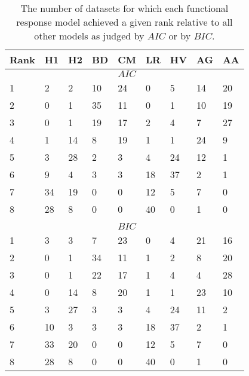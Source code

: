 \begin{table}[!tbp]
\caption{The number of datasets for which each functional response model achieved a given rank relative to all other models as judged by $AIC$ or by $BIC$.\label{table:AIC_and_BIC_rankings}} 
\begin{center}
\begin{tabular}{lllllllll}
\hline\hline
\multicolumn{1}{l}{Rank}&\multicolumn{1}{c}{H1}&\multicolumn{1}{c}{H2}&\multicolumn{1}{c}{BD}&\multicolumn{1}{c}{CM}&\multicolumn{1}{c}{LR}&\multicolumn{1}{c}{HV}&\multicolumn{1}{c}{AG}&\multicolumn{1}{c}{AA}\tabularnewline
\hline
&&&&$AIC$&&&&\tabularnewline
1&2&2&10&24&0&5&14&20\tabularnewline
2&0&1&35&11&0&1&10&19\tabularnewline
3&0&1&19&17&2&4&7&27\tabularnewline
4&1&14&8&19&1&1&24&9\tabularnewline
5&3&28&2&3&4&24&12&1\tabularnewline
6&9&4&3&3&18&37&2&1\tabularnewline
7&34&19&0&0&12&5&7&0\tabularnewline
8&28&8&0&0&40&0&1&0\tabularnewline
&&&&&&&&\tabularnewline
&&&&$BIC$&&&&\tabularnewline
1&3&3&7&23&0&4&21&16\tabularnewline
2&0&1&34&11&1&2&8&20\tabularnewline
3&0&1&22&17&1&4&4&28\tabularnewline
4&0&14&8&20&1&1&23&10\tabularnewline
5&3&27&3&3&4&24&11&2\tabularnewline
6&10&3&3&3&18&37&2&1\tabularnewline
7&33&20&0&0&12&5&7&0\tabularnewline
8&28&8&0&0&40&0&1&0\tabularnewline
\hline
\end{tabular}\end{center}
\end{table}
